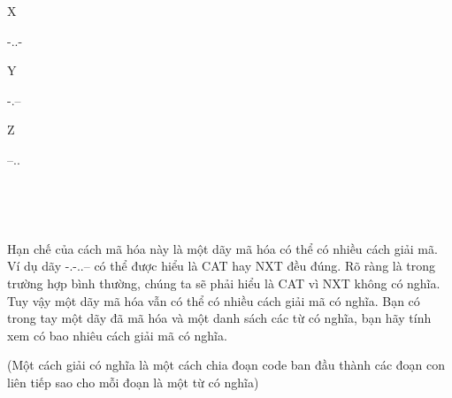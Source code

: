 X

-..-

Y

-.--

Z

--..

 

 

Hạn chế của cách mã hóa này là một dãy mã hóa có thể có nhiều cách giải mã. Ví dụ dãy -.-..-- có thể được hiểu là CAT hay NXT đều đúng. Rõ ràng là trong trường hợp bình thường, chúng ta sẽ phải hiểu là CAT vì NXT không có nghĩa. Tuy vậy một dãy mã hóa vẫn có thể có nhiều cách giải mã có nghĩa. Bạn có trong tay một dãy đã mã hóa và một danh sách các từ có nghĩa, bạn hãy tính xem có bao nhiêu cách giải mã có nghĩa.

(Một cách giải có nghĩa là một cách chia đoạn code ban đầu thành các đoạn con liên tiếp sao cho mỗi đoạn là một từ có nghĩa)